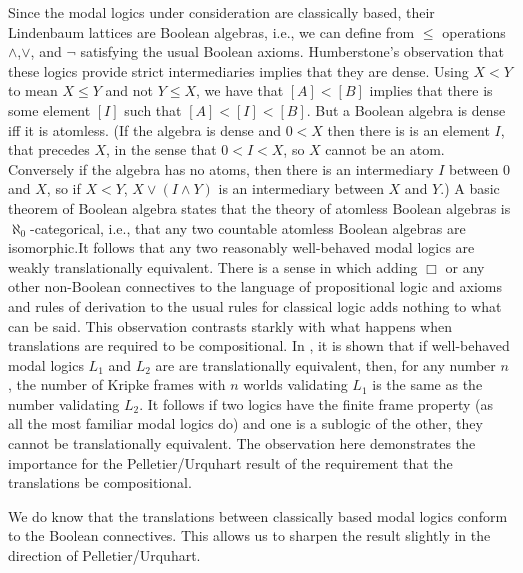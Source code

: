 \documentclass[11pt]{article}
\begin{document}
Since the modal logics under consideration are classically based, their Lindenbaum lattices are Boolean algebras, i.e., we can define from $\le $ operations $\wedge $,$\vee $, and $\neg $ satisfying the usual Boolean axioms. Humberstone's observation that these logics provide strict intermediaries implies that they are dense. Using $X{<}Y$ to mean $X\le Y$ and not $Y\le X$, we have that $[A]{<}[B]$ implies that there is some element $[I]$ such that $[A]{<}[I]{<}[B]$. But a Boolean algebra is dense iff it is atomless. (If the algebra is dense and $0{<}X$ then there is is an element $I$, that precedes $X$, in the sense that $0{<}I{<}X$, so $X$ cannot be an atom. Conversely if the algebra has no atoms, then there is an intermediary $I$ between $0$ and $X$, so if $X{<}Y$, $X\vee (I\wedge Y)$ is an intermediary between $X$ and $Y$.) A basic theorem of Boolean algebra states that the theory of atomless Boolean algebras is $\aleph_0$-categorical, i.e., that any two countable atomless Boolean algebras are isomorphic.\footnotemark It follows that any two reasonably well-behaved modal logics are weakly 
translationally equivalent. There is a sense in which adding $\Box $ or any other non-Boolean connectives to the language of propositional logic and axioms and rules of derivation to the usual rules for classical logic adds nothing to what can be said.  This observation contrasts starkly with what happens when translations are required to be compositional. In \citet{PelletierAndUrquhart}, it is shown that if well-behaved modal logics $L_1$ and $L_2$ are are translationally equivalent, then, for any number $n$, the number of Kripke frames with $n$ worlds validating $L_1$ is the same as the number validating $L_2$. It follows if two logics have the finite frame property (as all the most familiar modal logics do) and one is a sublogic of the other, they cannot be translationally equivalent. The observation here demonstrates the importance for the Pelletier/Urquhart result of the requirement that the translations be compositional.

We do know that the translations between classically based modal logics conform to the Boolean connectives. This allows us to sharpen the result slightly in the direction of Pelletier/Urquhart.
\end{document}
